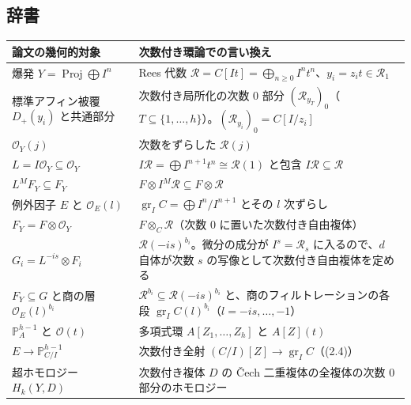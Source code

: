 \documentclass[11pt,a4paper]{ltjsarticle}
\theoremstyle{plain}
\theoremstyle{definition}
\newcommand{\Proj}{\operatorname{Proj}}
\newcommand{\gr}{\operatorname{gr}}
\newcommand{\PP}{\mathbb{P}}
\newcommand{\cO}{\mathcal{O}}
\newcommand{\cR}{\mathcal{R}}
\begin{document}
\subsection{辞書}
{\small
\begin{center}
\begin{tabularx}{\textwidth}{>{\raggedright}p{5.2cm}>{\raggedright\arraybackslash}X}
\toprule
論文の幾何的対象 & 次数付き環論での言い換え \\
\midrule
爆発 $Y = \Proj\bigoplus I^n$ & Rees 代数 $\cR = C[It] = \bigoplus_{n\ge0}I^nt^n$、$y_i = z_it\in\cR_1$ \\
標準アフィン被覆 $D_+(y_i)$ と共通部分 & 次数付き局所化の次数 $0$ 部分 $(\cR_{y_T})_0$（$T\subseteq\{1,\dots,h\}$）。$(\cR_{y_i})_0 = C[I/z_i]$ \\
$\cO_Y(j)$ & 次数をずらした $\cR(j)$ \\
$L = I\cO_Y\subseteq\cO_Y$ & $I\cR = \bigoplus I^{n+1}t^n\cong\cR(1)$ と包含 $I\cR\subseteq\cR$ \\
$L^MF_Y\subseteq F_Y$ & $F\otimes I^M\cR\subseteq F\otimes\cR$ \\
例外因子 $E$ と $\cO_E(l)$ & $\gr_IC = \bigoplus I^n/I^{n+1}$ とその $l$ 次ずらし \\
$F_Y = F\otimes\cO_Y$ & $F\otimes_C\cR$（次数 $0$ に置いた次数付き自由複体） \\
$G_i = L^{-is}\otimes F_i$ & $\cR(-is)^{b_i}$。微分の成分が $I^s = \cR_s$ に入るので、$d$ 自体が次数 $s$ の写像として次数付き自由複体を定める \\
$F_Y\subseteq G$ と商の層 $\cO_E(l)^{b_i}$ & $\cR^{b_i}\subseteq\cR(-is)^{b_i}$ と、商のフィルトレーションの各段 $\gr_IC(l)^{b_i}$（$l = -is,\dots,-1$） \\
$\PP^{h-1}_A$ と $\cO(t)$ & 多項式環 $A[Z_1,\dots,Z_h]$ と $A[Z](t)$ \\
$E\to\PP^{h-1}_{C/I}$ & 次数付き全射 $(C/I)[Z]\to\gr_IC$（(2.4)） \\
超ホモロジー $H_k(Y,D)$ & 次数付き複体 $D$ の Čech 二重複体の全複体の次数 $0$ 部分のホモロジー \\
\bottomrule
\end{tabularx}
\end{center}
}
\end{document}
